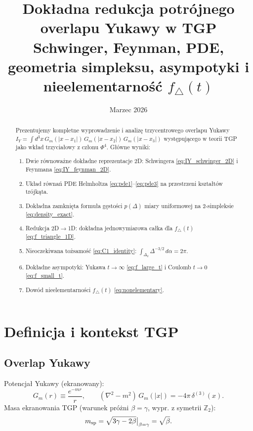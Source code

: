 \documentclass[11pt,a4paper]{article}
\title{Dok\l{}adna redukcja potr\'ojnego overlapu Yukawy w TGP\\[2mm]
\large Schwinger, Feynman, PDE, geometria simpleksu,
asympotyki i nieelementarno\'s\'c $f_{\triangle}(t)$}
\author{}
\date{Marzec 2026}
\begin{document}
\maketitle

\begin{abstract}
Prezentujemy kompletne wyprowadzenie i analiz\k{e} trzycentrowego overlapu Yukawy
$I_Y = \int d^3x\,G_m(|x-x_1|)\,G_m(|x-x_2|)\,G_m(|x-x_3|)$
wyst\k{e}puj\k{a}cego w teorii TGP jako wk\l{}ad trzycia\l{}owy z cz\l{}onu $\Phi^4$.
G\l{}\'owne wyniki:
\begin{enumerate}[label=(\roman*)]
\item Dwie r\'ownowa\.{z}ne dok\l{}adne reprezentacje 2D: Schwingera
  \eqref{eq:IY_schwinger_2D} i Feynmana \eqref{eq:IY_feynman_2D}.
\item Uk\l{}ad r\'owna\'n PDE Helmholtza
  \eqref{eq:pde1}--\eqref{eq:pde3} na przestrzeni kszta\l{}t\'ow tr\'ojk\k{a}ta.
\item Dok\l{}adna zamkni\k{e}ta formu\l{}a gęsto\'sci
  $p(\Delta)$ miary uniformowej na 2-simpleksie \eqref{eq:density_exact}.
\item Redukcja 2D$\to$1D: dok\l{}adna jednowymiarowa ca\l{}ka dla $f_\triangle(t)$
  \eqref{eq:f_triangle_1D}.
\item Nieoczekiwana to\.{z}samo\'s\'c \eqref{eq:C1_identity}:
  $\int_{\Delta_2}\Delta^{-3/2}\,d\alpha = 2\pi$.
\item Dok\l{}adne asympotyki: Yukawa $t\to\infty$ \eqref{eq:f_large_t}
  i Coulomb $t\to 0$ \eqref{eq:f_small_t}.
\item Dow\'od nieelementarno\'sci $f_\triangle(t)$ \eqref{eq:nonelementary}.
\end{enumerate}
\end{abstract}

\tableofcontents\bigskip

\section{Definicja i kontekst TGP}

\subsection{Overlap Yukawy}

Potencja\l{} Yukawy (ekranowany):
\begin{equation}
G_m(r) \equiv \frac{e^{-mr}}{r}, \qquad
(\nabla^2 - m^2)\,G_m(|x|) = -4\pi\,\delta^{(3)}(x).
\end{equation}
Masa ekranowania TGP (warunek pr\'o\.{z}ni $\beta=\gamma$, wypr. z symetrii $\mathbb{Z}_2$):
\begin{equation}
m_{\rm sp} = \sqrt{3\gamma - 2\beta}\big|_{\beta=\gamma} = \sqrt{\beta}.
\end{equation}
\end{document}

